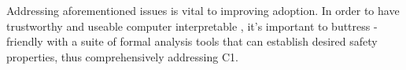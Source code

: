 Addressing aforementioned issues is vital to improving \CDSS{} adoption.
In order to have trustworthy and useable computer interpretable \BPGs{},
it's important to buttress  \HCP{}-friendly \DSLs{}
with a suite of formal analysis tools that can establish desired safety
properties, thus comprehensively addressing C1.

